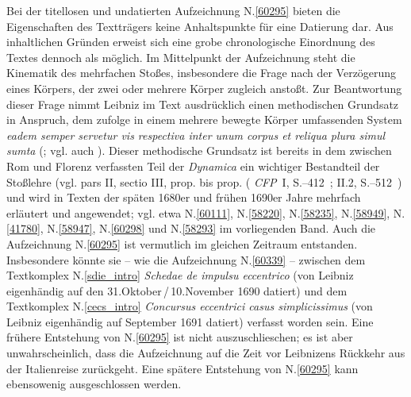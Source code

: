 \begin{ledgroup}%
\footnotesize%
\pstart%
\noindent%
%
Bei der titellosen und undatierten Aufzeichnung N.\;\ref{60295} bieten die Eigenschaften des Textträgers keine Anhaltspunkte für eine Datierung dar.
Aus inhaltlichen Gründen erweist sich eine grobe chronologische Einordnung des Textes dennoch als möglich.
Im Mittelpunkt der Aufzeichnung steht die Kinematik des mehrfachen Stoßes, insbesondere die Frage nach der Verzögerung eines Körpers, der zwei oder mehrere Körper zugleich anstoßt.
Zur Beantwortung dieser Frage nimmt Leibniz im Text ausdrücklich einen methodischen Grundsatz in Anspruch, dem zufolge in einem mehrere bewegte Körper umfassenden System \textit{eadem semper servetur vis respectiva inter unum corpus et reliqua plura simul sumta} (; vgl. auch ).
Dieser methodische Grundsatz %
ist bereits in dem zwischen Rom und Florenz verfassten Teil der \textit{Dynamica} ein wichtiger Bestandteil der Stoßlehre (vgl. pars II, sectio III, %
prop. bis prop.
(%
\textit{CFP}~I, S.--412~;
II.2, S.--512~)\cite{01354}
und wird in Texten der späten 1680er und frühen 1690er Jahre mehrfach erläutert und angewendet;
vgl. etwa N.\;\ref{60111}, N.\;\ref{58220}, N.\;\ref{58235}, N.\;\ref{58949}, N.\;\ref{41780}, N.\;\ref{58947}, N.\;\ref{60298} und N.\;\ref{58293} im vorliegenden Band.
Auch die Aufzeichnung N.\;\ref{60295} ist vermutlich im gleichen Zeitraum entstanden.
Insbesondere könnte sie -- wie die Aufzeichnung N.\;\ref{60339} -- zwischen dem Textkomplex N.\;\ref{sdie_intro} \textit{Schedae de impulsu eccentrico} (von Leibniz eigenhändig auf den 31.\;Oktober\,/\,10.\;November 1690 datiert) und dem Textkomplex N.\;\ref{cecs_intro} \textit{Concursus eccentrici casus simplicissimus} (von Leibniz eigenhändig auf September 1691 datiert) verfasst worden sein.
Eine frühere Entstehung von N.\;\ref{60295} ist nicht auszuschlieschen; es ist aber unwahrscheinlich, dass die Aufzeichnung auf die Zeit vor Leibnizens Rückkehr aus der Italienreise zurückgeht.
Eine spätere Entstehung von N.\;\ref{60295} kann ebensowenig ausgeschlossen werden.
\pend%
\end{ledgroup}%
\normalsize%
%
\frenchspacing%
